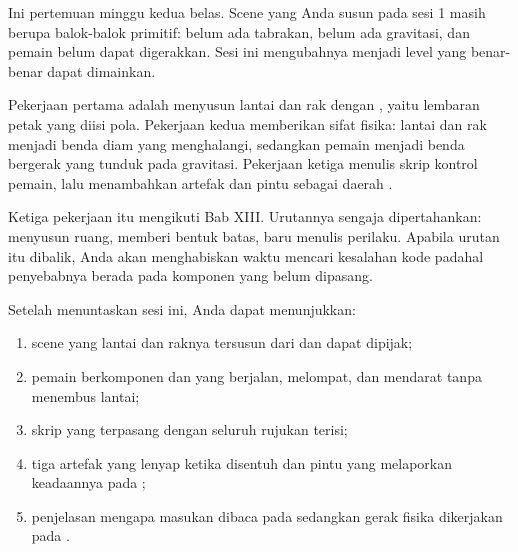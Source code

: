 

Ini pertemuan minggu kedua belas. Scene  yang Anda susun pada
sesi 1 masih berupa balok-balok primitif: belum ada tabrakan, belum ada
gravitasi, dan pemain belum dapat digerakkan. Sesi ini mengubahnya menjadi
level yang benar-benar dapat dimainkan.

Pekerjaan pertama adalah menyusun lantai dan rak dengan ,
yaitu lembaran petak yang diisi pola. Pekerjaan kedua memberikan sifat fisika:
lantai dan rak menjadi benda diam yang menghalangi, sedangkan pemain menjadi
benda bergerak yang tunduk pada gravitasi. Pekerjaan ketiga menulis skrip
kontrol pemain, lalu menambahkan artefak dan pintu sebagai daerah
.

Ketiga pekerjaan itu mengikuti Bab XIII. Urutannya sengaja dipertahankan:
menyusun ruang, memberi bentuk batas, baru menulis perilaku. Apabila urutan
itu dibalik, Anda akan menghabiskan waktu mencari kesalahan kode padahal
penyebabnya berada pada komponen yang belum dipasang.


\begin{tujuanbox}
Setelah menuntaskan sesi ini, Anda dapat menunjukkan:
\begin{enumerate}[leftmargin=1.5em, itemsep=0.2em]
  \item scene  yang lantai dan raknya tersusun dari
         dan dapat dipijak;
  \item pemain berkomponen  dan  yang berjalan, melompat, dan mendarat tanpa menembus lantai;
  \item skrip  yang terpasang dengan seluruh rujukan
         terisi;
  \item tiga artefak yang lenyap ketika disentuh dan pintu yang melaporkan
        keadaannya pada ;
  \item penjelasan mengapa masukan dibaca pada  sedangkan gerak
        fisika dikerjakan pada .
\end{enumerate}
\end{tujuanbox}

